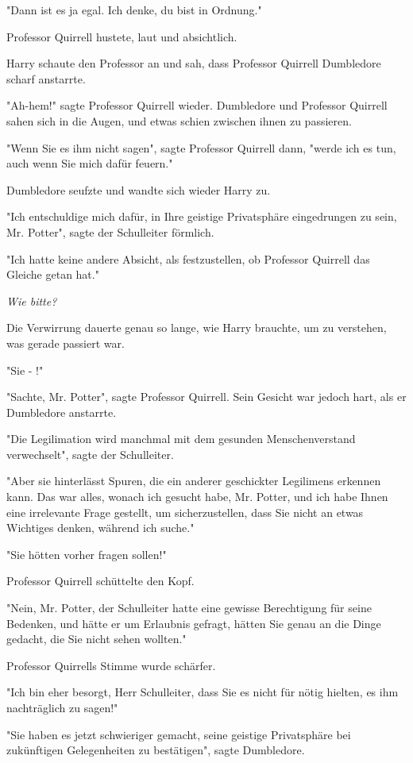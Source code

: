 {"Dann ist es ja egal. Ich denke, du bist in Ordnung."

Professor Quirrell hustete, laut und absichtlich.

Harry schaute den Professor an und sah, dass Professor Quirrell Dumbledore scharf anstarrte.

"Ah-hem!" sagte Professor Quirrell wieder. Dumbledore und Professor Quirrell sahen sich in die Augen, und etwas schien zwischen ihnen zu passieren.

"Wenn Sie es ihm nicht sagen", sagte Professor Quirrell dann, "werde ich es tun, auch wenn Sie mich dafür feuern."

Dumbledore seufzte und wandte sich wieder Harry zu.

"Ich entschuldige mich dafür, in Ihre geistige Privatsphäre eingedrungen zu sein, Mr. Potter", sagte der Schulleiter förmlich.

"Ich hatte keine andere Absicht, als festzustellen, ob Professor Quirrell das Gleiche getan hat."

\emph{Wie bitte?}

Die Verwirrung dauerte genau so lange, wie Harry brauchte, um zu verstehen, was gerade passiert war.

"Sie - !"

"Sachte, Mr. Potter", sagte Professor Quirrell. Sein Gesicht war jedoch hart, als er Dumbledore anstarrte.

"Die Legilimation wird manchmal mit dem gesunden Menschenverstand verwechselt", sagte der Schulleiter.

"Aber sie hinterlässt Spuren, die ein anderer geschickter Legilimens erkennen kann. Das war alles, wonach ich gesucht habe, Mr. Potter, und ich habe Ihnen eine irrelevante Frage gestellt, um sicherzustellen, dass Sie nicht an etwas Wichtiges denken, während ich suche."

"Sie hötten vorher fragen sollen!"

Professor Quirrell schüttelte den Kopf.

"Nein, Mr. Potter, der Schulleiter hatte eine gewisse Berechtigung für seine Bedenken, und hätte er um Erlaubnis gefragt, hätten Sie genau an die Dinge gedacht, die Sie nicht sehen wollten."

Professor Quirrells Stimme wurde schärfer.

"Ich bin eher besorgt, Herr Schulleiter, dass Sie es nicht für nötig hielten, es ihm nachträglich zu sagen!"

"Sie haben es jetzt schwieriger gemacht, seine geistige Privatsphäre bei zukünftigen Gelegenheiten zu bestätigen", sagte Dumbledore.

}
